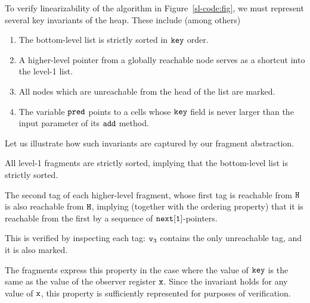 To verify linearizability of the algorithm in Figure~\ref{sl-code:fig},
we must represent several key invariants of the heap. These include (among others)
\begin{enumerate}
\item The bottom-level list is strictly sorted in $\tt key$ order.
\item A higher-level pointer from a globally reachable node serves  as a shortcut into the level-1 list.
\item All nodes which are unreachable from the head of the list are marked.
\item The variable $\tt pred$ points to a cells whose $\tt key$ field is never
  larger than the input parameter of its $\tt add$ method.
\end{enumerate}
Let us illustrate how such invariants are captured by our fragment abstraction.
\begin{inparaenum}[1)]
\item
  All level-1 fragments are strictly sorted, implying that the bottom-level list is strictly sorted.
\item
  The second tag of each higher-level fragment, whose first tag is
  reachable from $\tt H$ is also reachable from $\tt H$, 
  implying (together with the ordering property)
  that it is reachable from the first 
  by a sequence of $\tt next[1]$-pointers.
\item
  This is verified by inspecting each tag: $\mathtt{v}_{3}$ contains the only unreachable tag, and it is also marked.
\item
  The fragments express this property in the case where the value of $\tt key$ is
  the same as the value of the observer register $\tt x$. 
 Since the invariant holds for any value of $\tt x$, this property
  is sufficiently represented for purposes of verification.
\end{inparaenum}

